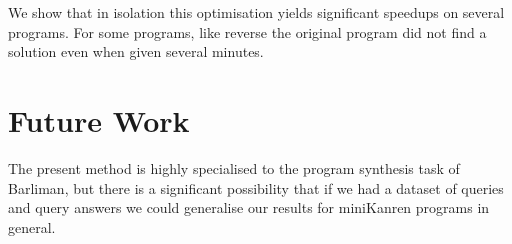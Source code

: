 \documentclass[submission,copyright,creativecommons]{eptcs}
\begin{document}
We show that in isolation this optimisation yields
significant speedups on several programs. For some programs, like
reverse the original program did not find a solution even when given
several minutes.

\section{Future Work}

The present method is highly specialised to the program synthesis task
of Barliman, but there is a significant possibility that if we had a
dataset of queries and query answers we could generalise our results
for miniKanren programs in general.



\end{document}
